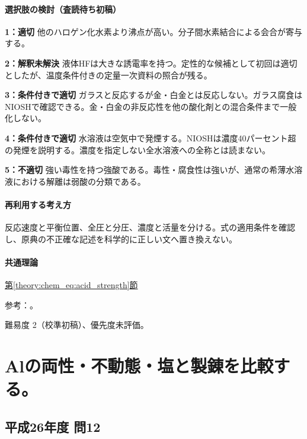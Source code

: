 \paragraph{選択肢の検討（査読待ち初稿）}\mbox{}\par

\noindent\textbf{1：適切} 他のハロゲン化水素より沸点が高い。分子間水素結合による会合が寄与する。\par

\noindent\textbf{2：解釈未解決} 液体HFは大きな誘電率を持つ。定性的な候補として初回は適切としたが、温度条件付きの定量一次資料の照合が残る。\par

\noindent\textbf{3：条件付きで適切} ガラスと反応するが金・白金とは反応しない。ガラス腐食はNIOSHで確認できる。金・白金の非反応性を他の酸化剤との混合条件まで一般化しない。\par

\noindent\textbf{4：条件付きで適切} 水溶液は空気中で発煙する。NIOSHは濃度40パーセント超の発煙を説明する。濃度を指定しない全水溶液への全称とは読まない。\par

\noindent\textbf{5：不適切} 強い毒性を持つ強酸である。毒性・腐食性は強いが、通常の希薄水溶液における解離は弱酸の分類である。\par

\paragraph{再利用する考え方} 反応速度と平衡位置、全圧と分圧、濃度と活量を分ける。式の適用条件を確認し、原典の不正確な記述を科学的に正しい文へ置き換えない。

\paragraph{共通理論} \hyperref[theory:chem_eq:acid_strength]{第\ref*{theory:chem_eq:acid_strength}節}

\par 参考：\cite{purdue_acid_strength,niosh_hf}。

\par 難易度 2（校準初稿）、優先度未評価。

\section{Alの両性・不動態・塩と製錬を比較する。}

\subsection{平成26年度 問12}
\label{q:h26-reg-applied-12}

